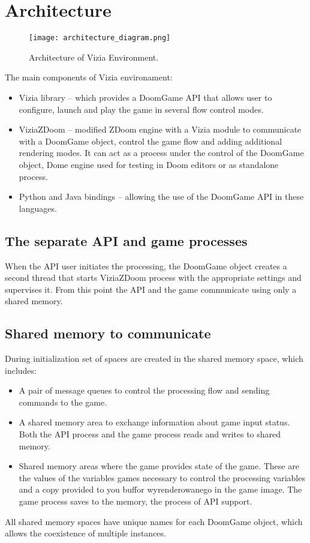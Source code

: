 \section{Architecture}\label{sec:architecture}
	\begin{figure}
			\centering
			\texttt{[image: architecture\_diagram.png]}
			\caption{Architecture of Vizia Environment.}\label{fig:architecture_diagram}
	\end{figure}

The main components of Vizia environament:
    \begin{itemize}
    \item Vizia library -- which provides a DoomGame API that allows user to configure, launch and play the game in several flow control modes.
    \item ViziaZDoom -- modified ZDoom engine with a Vizia module to communicate with a DoomGame object, control the game flow and adding additional rendering modes. It can act as a process under the control of the DoomGame object, Dome engine used for testing in Doom editors or as standalone process.
    \item Python and Java bindings -- allowing the use of the DoomGame API in these languages.
    \end{itemize}


\subsection{The separate API and game processes}\label{sec:architecture_separate_processes}

When the API user initiates the processing, the DoomGame object creates a second thread that starts ViziaZDoom process with the appropriate settings and supervises it. From this point the API and the game communicate using only a shared memory.


\subsection{Shared memory to communicate}\label{sec:architecture_shared_memory}

During initialization set of spaces are created in the shared memory space, which includes:
    \begin{itemize}
    \item A pair of message queues to control the processing flow and sending commands to the game.
    \item A shared memory area to exchange information about game input status. Both the API process and the game process reads and writes to shared memory.
    \item Shared memory areas where the game provides state of the game. These are the values of the variables games necessary to control the processing variables and a copy provided to you buffor wyrenderowanego in the game image. The game process saves to the memory, the process of API support.
    \end{itemize}
All shared memory spaces have unique names for each DoomGame object, which allows the coexistence of multiple instances.



